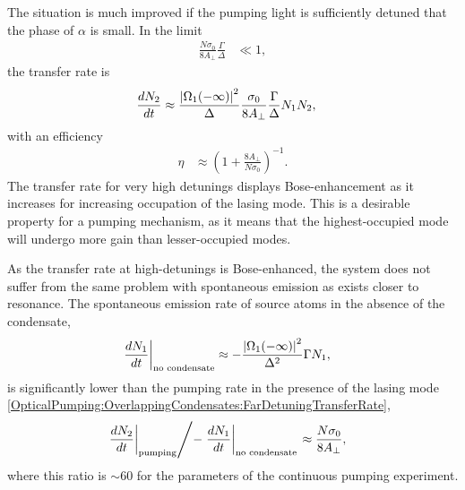 The situation is much improved if the pumping light is sufficiently detuned that the phase of $\alpha$ is small.  In the limit
\begin{align}
    \frac{N \sigma_0}{8 A_\perp} \frac{\Gamma}{\Delta} &\ll 1,
\end{align}
the transfer rate is
\begin{align}
    \frac{d N_2}{dt} &\approx \frac{\abs{\Omega_1(-\infty)}^2}{\Delta} \frac{\sigma_0}{8 A_\perp} \frac{\Gamma}{\Delta} N_1 N_2, \label{OpticalPumping:OverlappingCondensates:FarDetuningTransferRate}
\end{align}
with an efficiency
\begin{align}
    \eta &\approx \left(1 + \frac{8 A_\perp}{N \sigma_0}\right)^{-1}.
\end{align}
The transfer rate for very high detunings displays Bose-enhancement as it increases for increasing occupation of the lasing mode.  This is a desirable property for a pumping mechanism, as it means that the highest-occupied mode will undergo more gain than lesser-occupied modes.  

As the transfer rate at high-detunings is Bose-enhanced, the system does not suffer from the same problem with spontaneous emission as exists closer to resonance.  The spontaneous emission rate of source atoms in the absence of the condensate,
\begin{align}
    \left. \frac{d N_1}{dt} \right|_\text{no condensate} &\approx - \frac{\left|\Omega_1(-\infty)\right|^2}{\Delta^2}\Gamma N_1,
\end{align}
is significantly lower than the pumping rate in the presence of the lasing mode \eqref{OpticalPumping:OverlappingCondensates:FarDetuningTransferRate},
\begin{align}
    \left. \left. \frac{d N_2}{dt} \right|_\text{pumping} \middle / - \left. \frac{d N_1}{dt} \right|_\text{no condensate} \right. &\approx \frac{N \sigma_0}{8 A_\perp},
\end{align}
where this ratio is $\sim 60$ for the parameters of the continuous pumping experiment.

